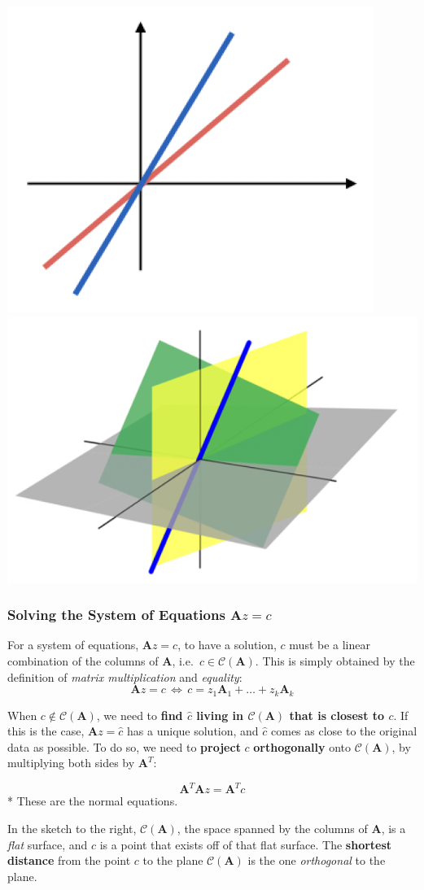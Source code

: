 \documentclass[
]{book}
\begin{document}
\includegraphics[width=0.35\linewidth,height=\textheight,keepaspectratio]{images/week2/subspace1.png} \includegraphics[width=0.35\linewidth,height=\textheight,keepaspectratio]{images/week2/subspace2.png}

\subsubsection*{\texorpdfstring{Solving the System of Equations \(\mathbf{A}z=c\)}{Solving the System of Equations \textbackslash mathbf\{A\}z=c}}\label{solving-the-system-of-equations-mathbfazc}

For a system of equations, \(\mathbf{A} z = c\), to have a solution, \(c\) must be a linear combination of the columns of \(\mathbf{A}\), i.e.~\(c \in \mathcal{C}(\mathbf{A})\). This is simply obtained by the definition of \emph{matrix multiplication} and \emph{equality}:
\[\mathbf{A} z = c \, \Leftrightarrow \, c = z_1 \mathbf{A}_1 + \ldots + z_k \mathbf{A}_k\]

When \(c \notin \mathcal{C}(\mathbf{A})\), we need to \textbf{find \(\hat{c}\) living in \(\mathcal{C}(\mathbf{A})\) that is closest to \(c\)}. If this is the case, \(\mathbf{A} z = \hat{c}\) has a unique solution, and \(\hat{c}\) comes as close to the original data as possible.
To do so, we need to \textbf{project} \(c\) \textbf{orthogonally} onto \(\mathcal{C}(\mathbf{A})\), by multiplying both sides by \(\mathbf{A}^T\):

\[\mathbf{A}^T\mathbf{A} z = \mathbf{A}^T c\]
* These are the normal equations.

In the sketch to the right, \(\mathcal{C}(\mathbf{A})\), the space spanned by the columns of \(\mathbf{A}\), is a \emph{flat} surface, and \(c\) is a point that exists off of that flat surface. The \textbf{shortest distance} from the point \(c\) to the plane \(\mathcal{C}(\mathbf{A})\) is the one \emph{orthogonal} to the plane.
\end{document}
